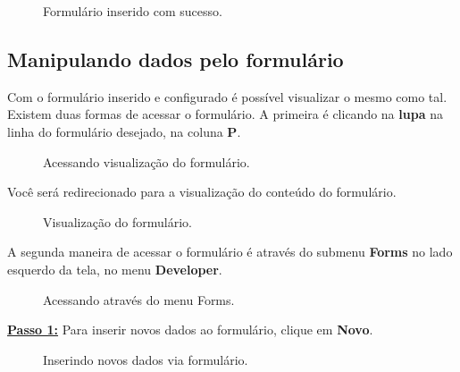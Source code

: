 \documentclass[9pt]{report}
\begin{document}
{      \begin{figure}[H]
        \caption{Formulário inserido com sucesso.}
        \label{fig:forminserido}
      \end{figure}

      \subsection{Manipulando dados pelo formulário}

      Com o formulário inserido e
      configurado é possível visualizar o mesmo como tal. Existem
      duas formas de acessar o formulário. A primeira é clicando na
      \textbf{lupa} na linha do formulário desejado, na coluna
      \textbf{P}.

      \begin{figure}[H]
        \caption{Acessando visualização do formulário.}
        \label{fig:preview}
      \end{figure}

      Você será redirecionado para a visualização do conteúdo do
      formulário.
           
      \begin{figure}[H]
        \caption{Visualização do formulário.}
        \label{fig:visualizacao}
      \end{figure}

      A segunda maneira de acessar o formulário é através do submenu
      \textbf{Forms} no lado esquerdo da tela, no menu
      \textbf{Developer}.

      \begin{figure}[H]
        \caption{Acessando através do menu Forms.}
        \label{fig:Forms}
      \end{figure}

      \underline{\textbf{Passo 1:}} Para inserir novos dados ao
      formulário, clique em \textbf{Novo}.

      \begin{figure}[H]
        \caption{Inserindo novos dados via formulário.}
        \label{fig:novosdados}
      \end{figure}
      
}
\end{document}
